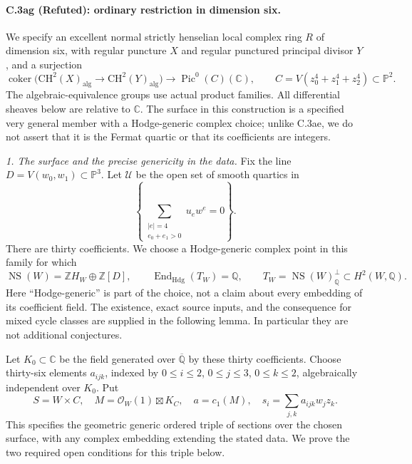 \paragraph{C.3ag (Refuted): ordinary restriction in dimension six.}
We specify an excellent normal strictly henselian local
complex ring $R$ of dimension six, with regular puncture
$X$ and regular punctured principal divisor $Y$, and a
surjection
\[
 \operatorname{coker}\bigl(
 \mathrm{CH}^2(X)_{\mathrm{alg}}\longrightarrow
 \mathrm{CH}^2(Y)_{\mathrm{alg}}\bigr)
       \longrightarrow \operatorname{Pic}^0(C)(\mathbb C),
 \qquad C=V(z_0^4+z_1^4+z_2^4)\subset\mathbb P^2.
\]
The algebraic-equivalence groups use actual product
families. All differential sheaves below are relative
to $\mathbb C$. The surface in this construction is a
specified very general member with a Hodge-generic
complex choice; unlike C.3ae, we do not assert that it
is the Fermat quartic or that its coefficients are integers.

\emph{1. The surface and the precise genericity in the data.}
Fix the line $D=V(w_0,w_1)\subset\mathbb P^3$. Let
$\mathcal U$ be the open set of smooth quartics in
\[
 \left\{\sum_{\substack{|e|=4\\e_0+e_1>0}}
                 u_e w^e=0\right\}.
\]
There are thirty coefficients. We choose a Hodge-generic
complex point in this family for which
\[
 \operatorname{NS}(W)=\mathbb Z H_W\oplus\mathbb Z[D],
 \qquad \operatorname{End}_{\mathrm{Hdg}}(T_W)=\mathbb Q,
 \qquad T_W=\operatorname{NS}(W)_{\mathbb Q}^{\perp}
                  \subset H^2(W,\mathbb Q).
\]
Here ``Hodge-generic'' is part of the choice, not a
claim about every embedding of its coefficient field.
The existence, exact source inputs, and the consequence
for mixed cycle classes are supplied in the following
lemma. In particular they are not additional conjectures.



Let $K_0\subset\mathbb C$ be the field generated over
$\overline{\mathbb Q}$ by these thirty coefficients.
Choose thirty-six elements $a_{ijk}$, indexed by
$0\le i\le2$, $0\le j\le3$, $0\le k\le2$, algebraically
independent over $K_0$. Put
\[
 S=W\times C,\quad M=\mathcal O_W(1)\boxtimes K_C,
 \quad a=c_1(M),\quad
 s_i=\sum_{j,k}a_{ijk}w_jz_k.
\]
This specifies the geometric generic ordered triple
of sections over the chosen surface, with any complex
embedding extending the stated data. We prove the
two required open conditions for this triple below.

